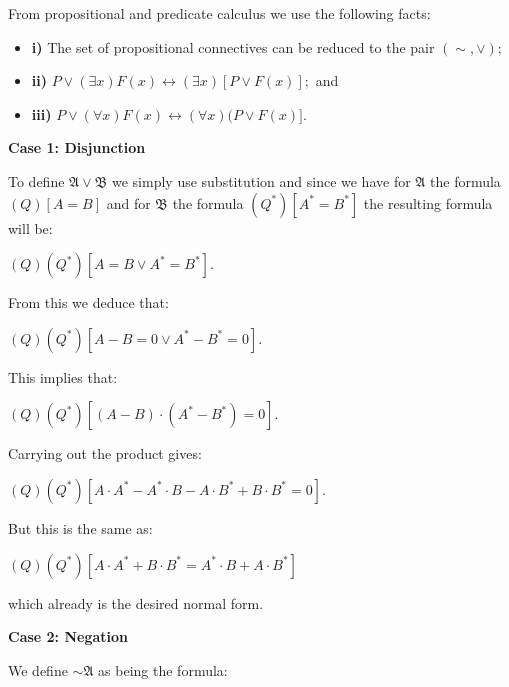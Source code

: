 \documentclass[12pt]{article}
\begin{document}
From propositional and predicate calculus we use the following facts:

\begin{itemize}
\item \textbf{i)} The set of propositional connectives can be reduced to the pair $(\sim, \vee);$

\item \textbf{ii)} $P \vee (\exists x) F (x) \leftrightarrow (\exists x) [P \vee F (x)];$ and

\item \textbf{iii)} $P \vee (\forall x) F (x) \leftrightarrow (\forall x) (P \vee F (x)].$
\end{itemize}

\textbf{Case 1: Disjunction}
 
To define $\mathfrak{A} \vee \mathfrak{B}$ we simply use substitution and since we have for $\mathfrak{A}$ the formula $(Q) [A = B]$ and for $\mathfrak{B}$ the formula $(Q^*) [A^* = B^*]$ the resulting formula will be:

\begin{center}
$(Q) (Q^*) [A = B \vee A^* = B^*].$
\end{center}

From this we deduce that:

\begin{center}
$(Q) (Q^*) [A - B = 0 \vee A^* - B^* = 0].$
\end{center}

This implies that:

\begin{center}
$(Q) (Q^*) [(A - B) \cdot (A^* - B^*) = 0].$
\end{center}

Carrying out the product gives:

\begin{center}
$(Q) (Q^*) [A \cdot A^* - A^* \cdot B - A \cdot B^* + B \cdot B^* = 0].$
\end{center}

But this is the same as:

\begin{center} 
$(Q) (Q^*) [A \cdot A^* + B \cdot B^* = A^* \cdot B + A \cdot B^*]$
\end{center}

which already is the desired normal form.

\textbf{Case 2: Negation} 

We define $\sim \mathfrak{A}$ as being the formula:
\end{document}
